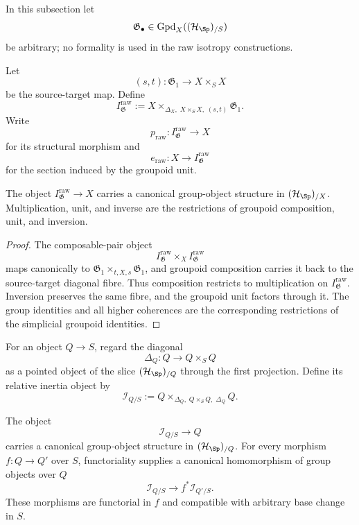In this subsection let
\[
    \mathfrak G_\bullet\in
    \operatorname{Gpd}_X((\mathcal H_{\Sp})_{/S})
\]
be arbitrary; no formality is used in the raw isotropy constructions.

\begin{definition}
\label{def:raw-isotropy-group}
Let
\[
    (s,t):
    \mathfrak G_1\longrightarrow X\times_SX
\]
be the source-target map.  Define
\[
    I^{\mathrm{raw}}_{\mathfrak G}
    :=
    X\times_{\Delta_X,\;X\times_SX,\;(s,t)}
    \mathfrak G_1.
\]
Write
\[
    p_{\mathrm{raw}}:
    I^{\mathrm{raw}}_{\mathfrak G}\to X
\]
for its structural morphism and
\[
    e_{\mathrm{raw}}:
    X\longrightarrow I^{\mathrm{raw}}_{\mathfrak G}
\]
for the section induced by the groupoid unit.
\end{definition}

\begin{proposition}
\label{prop:raw-isotropy-group}
The object
$I^{\mathrm{raw}}_{\mathfrak G}\to X$
carries a canonical group-object structure in $(\mathcal H_{\Sp})_{/X}$.
Multiplication, unit, and inverse are the restrictions of groupoid
composition, unit, and inversion.
\end{proposition}

\begin{proof}
The composable-pair object
\[
    I^{\mathrm{raw}}_{\mathfrak G}
    \times_X
    I^{\mathrm{raw}}_{\mathfrak G}
\]
maps canonically to
$\mathfrak G_1\times_{t,X,s}\mathfrak G_1$, and groupoid composition carries
it back to the source-target diagonal fibre.  Thus composition restricts to
multiplication on $I^{\mathrm{raw}}_{\mathfrak G}$.  Inversion preserves the
same fibre, and the groupoid unit factors through it.  The group identities
and all higher coherences are the corresponding restrictions of the
simplicial groupoid identities.
\end{proof}

\begin{definition}
\label{def:relative-inertia-object}
For an object $Q\to S$, regard the diagonal
\[
    \Delta_Q:Q\longrightarrow Q\times_SQ
\]
as a pointed object of the slice $(\mathcal H_{\Sp})_{/Q}$ through the first
projection.  Define its relative inertia object by
\[
    \mathcal I_{Q/S}
    :=
    Q\times_{\Delta_Q,\;Q\times_SQ,\;\Delta_Q}Q.
\]
\end{definition}

\begin{proposition}
\label{prop:relative-inertia-group}
The object
\[
    \mathcal I_{Q/S}\longrightarrow Q
\]
carries a canonical group-object structure in $(\mathcal H_{\Sp})_{/Q}$.  For every
morphism $f:Q\to Q'$ over $S$, functoriality supplies a canonical homomorphism
of group objects over $Q$
\[
    \mathcal I_{Q/S}
    \longrightarrow
    f^*\mathcal I_{Q'/S}.
\]
These morphisms are functorial in $f$ and compatible with arbitrary base
change in $S$.
\end{proposition}

